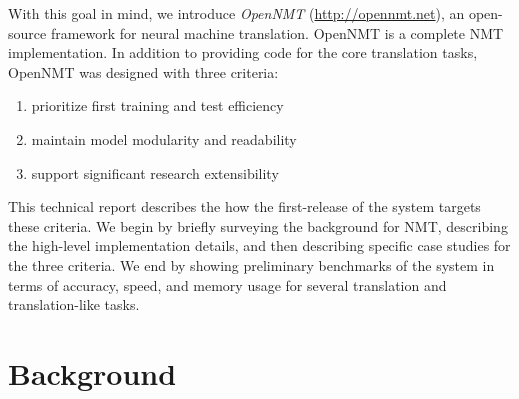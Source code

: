 \documentclass[11pt]{article}
\begin{document}
With this goal in mind, we introduce \textit{OpenNMT} (\url{http://opennmt.net}), an open-source framework
for neural machine translation. OpenNMT is a complete NMT
implementation. In addition to providing code for the core translation
tasks, OpenNMT was designed with three criteria:

\begin{enumerate}
\item prioritize first training and test efficiency
\item maintain model modularity and readability
\item support significant research extensibility  
\end{enumerate}

This technical report describes the how the first-release of the
system targets these criteria. We begin by briefly surveying the
background for NMT, describing the high-level implementation details,
and then describing specific case studies for the three criteria.  We
end by showing preliminary benchmarks of the system in terms of
accuracy, speed, and memory usage for several translation and
translation-like tasks.








\section{Background}
\end{document}

